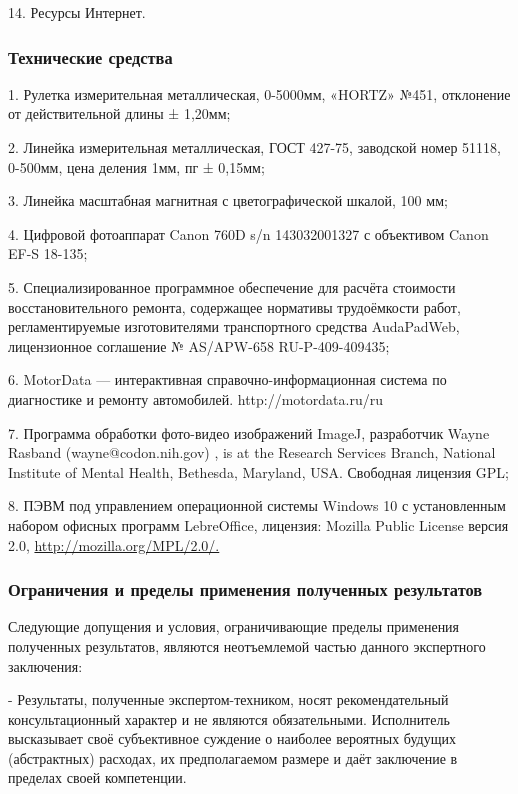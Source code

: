 14.  Ресурсы Интернет.



\subsubsection{Технические средства}

1. Рулетка измерительная металлическая, 0-5000мм, «HORTZ» №451, отклонение от действительной длины ± 1,20мм;

2. Линейка измерительная металлическая, ГОСТ 427-75, заводской номер 51118, 0-500мм, цена деления 1мм, пг ± 0,15мм;

3. Линейка масштабная магнитная с цветографической шкалой, 100 мм;

4. Цифровой фотоаппарат  Canon 760D s/n 143032001327  с объективом Canon EF-S 18-135;

5. Специализированное программное обеспечение для расчёта стоимости  восстановительного ремонта, содержащее нормативы трудоёмкости работ, регламентируемые изготовителями транспортного средства     AudaPadWeb, лицензионное соглашение № AS/APW-658  RU-P-409-409435;

6. MotorData — интерактивная справочно-информационная система по диагностике и ремонту автомобилей. http://motordata.ru/ru

7. Программа обработки фото-видео изображений ImageJ, разработчик  Wayne Rasband (wayne@codon.nih.gov) , is at the Research Services Branch, National Institute of Mental Health, Bethesda, Maryland, USA. Свободная лицензия GPL;

8. ПЭВМ под управлением операционной системы Windows 10 с установленным набором офисных программ LebreOffice, лицензия: Mozilla Public License версия 2.0, \url{http://mozilla.org/MPL/2.0/.}

\subsubsection{Ограничения и пределы применения полученных результатов}

      Следующие допущения и условия, ограничивающие пределы применения полученных результатов, являются неотъемлемой частью данного экспертного заключения:
      
\noindent  - Результаты, полученные экспертом-техником, носят рекомендательный консультационный характер и не являются обязательными. Исполнитель высказывает своё субъективное суждение о наиболее вероятных будущих (абстрактных) расходах, их предполагаемом размере и даёт заключение в пределах своей компетенции.

